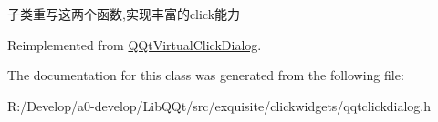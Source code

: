子类重写这两个函数,实现丰富的click能力 

Reimplemented from \mbox{\hyperlink{class_q_qt_virtual_click_dialog_a93e958d50ddc3fb38ca0e4905673cf74}{Q\+Qt\+Virtual\+Click\+Dialog}}.



The documentation for this class was generated from the following file\+:\begin{DoxyCompactItemize}
\item 
R\+:/\+Develop/a0-\/develop/\+Lib\+Q\+Qt/src/exquisite/clickwidgets/qqtclickdialog.\+h\end{DoxyCompactItemize}
